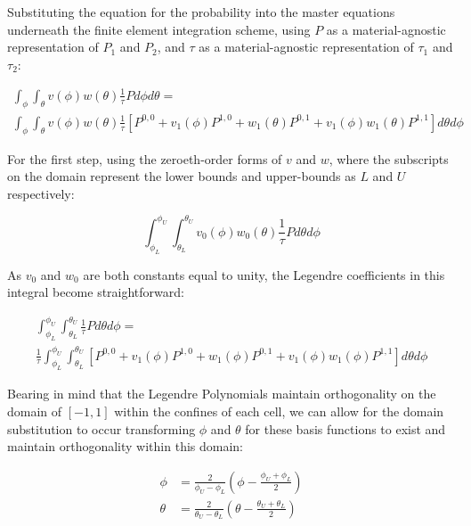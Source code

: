 \documentclass[12pt,a4paper,pagesize=pdftex]{scrartcl}
\begin{document}
Substituting the equation for the probability into the master equations underneath the finite element integration scheme, using \(P\) as a material-agnostic representation of \(P_1\) and \(P_2\), and \(\tau\) as a material-agnostic representation of \(\tau_1\) and \(\tau_2\):

\begin{multline*}
    \int_\phi \int_\theta v\left(\phi\right) w\left(\theta\right) \frac{1}{\tau} P d\phi d\theta = \\
    \int_\phi \int_\theta v\left(\phi\right) w\left(\theta\right) \frac{1}{\tau} \left[P^{0,0} + v_1\left(\phi\right) P^{1,0} + w_1\left(\theta\right) P^{0,1} + v_1\left(\phi\right) w_1\left(\theta\right) P^{1,1}\right] d\theta d\phi
\end{multline*}

For the first step, using the zeroeth-order forms of \(v\) and \(w\), where the subscripts on the domain represent the lower bounds and upper-bounds as \(L\) and \(U\) respectively:

\begin{equation*}
    \int_{\phi_L}^{\phi_U} \int_{\theta_L}^{\theta_U} v_0\left(\phi\right) w_0\left(\theta\right) \frac{1}{\tau} P d\theta d\phi
\end{equation*}

As \(v_0\) and \(w_0\) are both constants equal to unity, the Legendre coefficients in this integral become straightforward:

\begin{multline*}
    \int_{\phi_L}^{\phi_U} \int_{\theta_L}^{\theta_U} \frac{1}{\tau} P d\theta d\phi = \\
    \frac{1}{\tau} \int_{\phi_L}^{\phi_U} \int_{\theta_L}^{\theta_U} \left[P^{0,0} + v_1\left(\phi\right) P^{1,0} + w_1\left(\phi\right) P^{0,1} + v_1\left(\phi\right) w_1\left(\phi\right) P^{1,1}\right] d\theta d\phi
\end{multline*}

Bearing in mind that the Legendre Polynomials maintain orthogonality on the domain of \(\left[-1, 1\right]\) within the confines of each cell, we can allow for the domain substitution to occur transforming \(\phi\) and \(\theta\) for these basis functions to exist and maintain orthogonality within this domain:

\begin{align*}
    \phi & = \frac{2}{\phi_U - \phi_L} \left(\phi - \frac{\phi_U + \phi_L}{2}\right) \\
    \theta & = \frac{2}{\theta_U - \theta_L} \left(\theta - \frac{\theta_U + \theta_L}{2}\right)
\end{align*}
\end{document}
